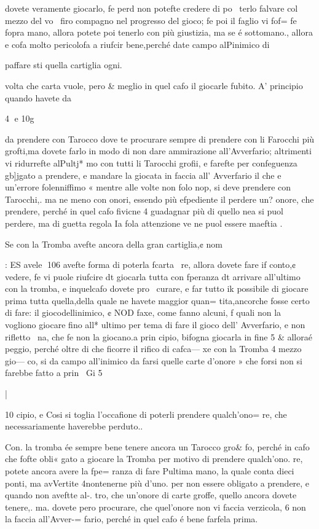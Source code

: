 \documentclass[12pt,a6paper]{article}
\begin{document}
dovete veramente giocarlo, fe
perd non potefte credere di po~
terlo falvare col mezzo del vo~
firo compagno nel progresso
del gioco; fe poi il faglio vi fof=
fe fopra mano, allora potete poi
tenerlo con più giustizia, ma se
é sottomano., allora e cofa molto pericolofa a riufcir bene,perché date campo alPinimico di

 

paffare sti quella cartiglia ogni.

volta che carta vuole, pero &
meglio in quel cafo il giocarle
fubito.
A’ principio quando havete
da

4
e
10g

da prendere con Tarocco dove
te procurare sempre di prendere con li Farocchi più grofti,ma
dovete farlo in modo di non dare ammirazione all’Avverfario;
altrimenti vi ridurrefte alPultj* mo con tutti li Tarocchi grofii,
e farefte per confeguenza gb]jgato a prendere, e mandare la
giocata in faccia all’ Avverfario
il che e un’errore folenniffimo «
mentre alle volte non folo nop,
si deve prendere con Tarocchi,.
ma ne meno con onori, essendo
più efpediente il perdere un?
onore, che prendere, perché in
quel cafo fivicne 4 guadagnar
più di quello nea si puol perdere, ma di guetta regola Ia fola
attenzione ve ne puol essere
maeftia .

Se con la Tromba avefte ancora della gran cartiglia,¢ nom

: ES avele
106
avefte forma di poterla fcarta~
re, allora dovete fare if conto,¢
vedere, fe vi puole riufcire dt
giocarla tutta con fperanza dt
arrivare all’ultimo con la tromba, e inquelcafo dovete pro~
curare, e far tutto ik possibile di
giocare prima tutta quella,della
quale ne havete maggior quan=
tita,ancorche fosse certo di fare:
il giocodellinimico, ¢ NOD faxe, come fanno alcuni, f quali
non la vogliono giocare fino all*
ultimo per tema di fare il gioco
dell’ Avverfario, e non rifletto~ 
na, che fe non la giocano.a prin
cipio, bifogna giocarla in fine 5
& alloraé peggio, perché oltre
di che ficorre il rifico di cafca—
xe con la Tromba 4 mezzo gio—
co, si da campo all’inimico da
farsi quelle carte d’onore » che
forsi non si farebbe fatto a prin~
Gi 5

|
 

10
cipio, e Cosi si toglia l’occafione
di poterli prendere qualch’ono=
re, che necessariamente haverebbe perduto..

Con. la tromba ée sempre bene
tenere ancora un Tarocco gro&
fo, perché in cafo che fofte obli«
gato a giocare la Tromba per
motivo di prendere qualch’ono.
re, potete ancora avere la fpe=
ranza di fare Pultima mano, la
quale conta dieci ponti, ma avVertite 4nontenerne più d’uno.
per non essere obligato a prendere, e quando non aveftte al-.
tro, che un’onore di carte groffe, quello ancora dovete tenere,.
ma. dovete pero procurare, che
quel’onore non vi faccia verzicola, 6 non la faccia all’Avver-=
fario, perché in quel cafo é bene farfela prima.
\end{document}
